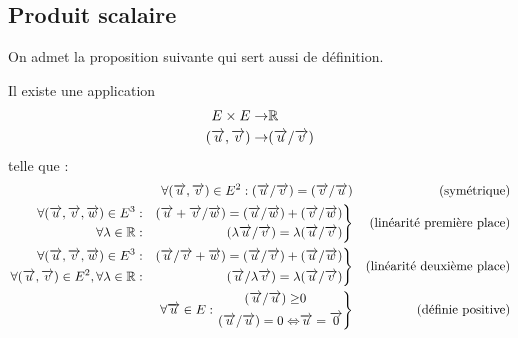 \subsection{Produit scalaire}
On admet la proposition suivante qui sert aussi de définition.
\begin{prop}
 Il existe une application
\begin{displaymath}
 \begin{aligned}
  E\times E \rightarrow& \mathbb{R} \\
  (\overrightarrow{u},\overrightarrow{v}) \rightarrow& (\overrightarrow{u}/\overrightarrow{v})
 \end{aligned}
\end{displaymath}
telle que :
\begin{align*}
 \forall (\overrightarrow{u},\overrightarrow{v})\in E^2 : (\overrightarrow{u}/\overrightarrow{v})=(\overrightarrow{v}/\overrightarrow{u}) & &\text{(symétrique)}\\
\left. 
\begin{aligned}
 \forall (\overrightarrow{u},\overrightarrow{v},\overrightarrow{w})\in E^3 &:&
(\overrightarrow{u}+\overrightarrow{v}/\overrightarrow{w})=(\overrightarrow{u}/\overrightarrow{w})+(\overrightarrow{v}/\overrightarrow{w})\\
\forall \lambda \in \mathbb{R} &:&  (\lambda\overrightarrow{u}/\overrightarrow{v})=\lambda(\overrightarrow{u}/\overrightarrow{v})
\end{aligned}
\right\rbrace  & & \text{(linéarité première place)} \\
\left. 
\begin{aligned}
 \forall (\overrightarrow{u},\overrightarrow{v},\overrightarrow{w})\in E^3 &:&
(\overrightarrow{u}/\overrightarrow{v}+\overrightarrow{w})=(\overrightarrow{u}/\overrightarrow{v})+(\overrightarrow{u}/\overrightarrow{w})\\
\forall (\overrightarrow{u},\overrightarrow{v})\in E^2, \forall \lambda \in \mathbb{R} &:&  (\overrightarrow{u}/\lambda\overrightarrow{v})=\lambda(\overrightarrow{u}/\overrightarrow{v})
\end{aligned}
\right\rbrace  & & \text{(linéarité deuxième place)} \\
\forall \overrightarrow{u}\in E :
\left. 
 \begin{aligned}
  (\overrightarrow{u}/\overrightarrow{u})\geq& 0 \\
(\overrightarrow{u}/\overrightarrow{u})=0\Leftrightarrow& \overrightarrow{u}=\overrightarrow{0}
 \end{aligned}
 \right\rbrace & & \text{(définie positive)}
\end{align*}
\end{prop}

